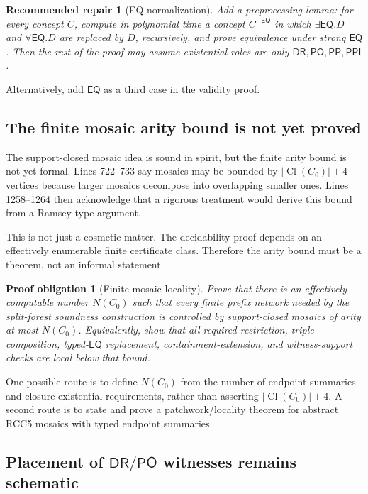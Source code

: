 \documentclass[11pt]{article}
\newcommand{\PP}{\mathsf{PP}}
\newcommand{\PPI}{\mathsf{PPI}}
\newcommand{\PO}{\mathsf{PO}}
\newcommand{\DR}{\mathsf{DR}}
\newcommand{\EQ}{\mathsf{EQ}}
\newcommand{\Cl}{\operatorname{Cl}}
\newtheorem{obligation}{Proof obligation}
\newtheorem{recommendation}{Recommended repair}
\begin{document}
\begin{recommendation}[EQ-normalization]
Add a preprocessing lemma: for every concept \(C\), compute in polynomial time a
concept \(C^{-\EQ}\) in which \(\exists\EQ.D\) and \(\forall\EQ.D\) are replaced
by \(D\), recursively, and prove equivalence under strong \(\EQ\).  Then the
rest of the proof may assume existential roles are only
\(\DR,\PO,\PP,\PPI\).
\end{recommendation}

Alternatively, add \(\EQ\) as a third case in the validity proof.

\subsection{The finite mosaic arity bound is not yet proved}

The support-closed mosaic idea is sound in spirit, but the finite arity bound is
not yet formal.  Lines 722--733 say mosaics may be bounded by
\(|\Cl(C_0)|+4\) vertices because larger mosaics decompose into overlapping
smaller ones.  Lines 1258--1264 then acknowledge that a rigorous treatment would
derive this bound from a Ramsey-type argument.

This is not just a cosmetic matter.  The decidability proof depends on an
effectively enumerable finite certificate class.  Therefore the arity bound must
be a theorem, not an informal statement.

\begin{obligation}[Finite mosaic locality]
Prove that there is an effectively computable number \(N(C_0)\) such that every
finite prefix network needed by the split-forest soundness construction is
controlled by support-closed mosaics of arity at most \(N(C_0)\).  Equivalently,
show that all required restriction, triple-composition, typed-\(\EQ\)
replacement, containment-extension, and witness-support checks are local below
that bound.
\end{obligation}

One possible route is to define \(N(C_0)\) from the number of endpoint summaries
and closure-existential requirements, rather than asserting \(|\Cl(C_0)|+4\).
A second route is to state and prove a patchwork/locality theorem for abstract
RCC5 mosaics with typed endpoint summaries.

\subsection{Placement of \texorpdfstring{$\DR/\PO$}{DR/PO} witnesses remains schematic}
\end{document}
